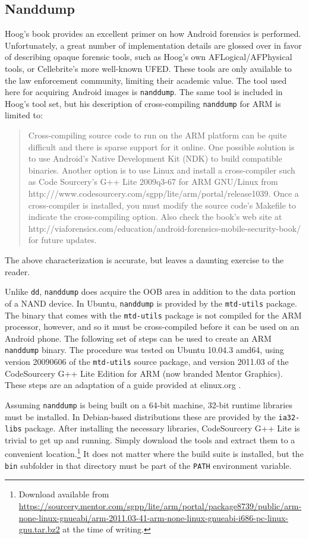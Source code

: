 \subsection{Nanddump}
Hoog's book \cite{hoog} provides an excellent primer on how Android forensics is performed.  Unfortunately, a great number of
implementation details are glossed over in favor of describing opaque forensic tools, such as Hoog's own AFLogical/AFPhysical tools,
or Cellebrite's more well-known UFED. These tools are only available to the law enforcement community, limiting their academic
value. The tool used here for acquiring Android images is \texttt{nanddump}. The same tool is included in Hoog's tool set, but his
description of cross-compiling \texttt{nanddump} for ARM is limited to: 
\begin{quote} Cross-compiling source code to run on the ARM platform can be quite difficult and there is sparse support for it
online.  One possible solution is to use Android's Native Development Kit (NDK) to build compatible binaries.  Another option is to
use Linux and install a cross-compiler such as Code Sourcery's G++ Lite 2009q3-67 for ARM GNU/Linux from
http:///www.codesourcery.com/sgpp/lite/arm/portal/release1039.  Once a cross-compiler is installed, you must modify the source
code's Makefile to indicate the cross-compiling option.  Also check the book's web site at
http://viaforensics.com/education/android-forensics-mobile-security-book/ for future updates.  \hspace{\fill}\cite{hoog} \end{quote}
The above characterization is accurate, but leaves a daunting exercise to the reader. 

Unlike \texttt{dd}, \texttt{nanddump} does acquire the OOB area in addition to the data portion of a NAND device.  In Ubuntu,
\texttt{nanddump} is provided by the \texttt{mtd-utils} package.  The binary that comes with the \texttt{mtd-utils} package is not
compiled for the ARM processor, however, and so it must be cross-compiled before it can be used on an Android phone.  The following
set of steps can be used to create an ARM \texttt{nanddump} binary.  The procedure was tested on Ubuntu 10.04.3 amd64, using version
20090606 of the \texttt{mtd-utils} source package, and version 2011.03 of the CodeSourcery G++ Lite Edition for ARM (now branded
Mentor Graphics).  These steps are an adaptation of a guide provided at elinux.org \cite{compilingmtd}.

Assuming \texttt{nanddump} is being built on a 64-bit machine, 32-bit runtime libraries must be installed.  In Debian-based
distributions these are provided by the \texttt{ia32-libs} package.  After installing the necessary libraries, CodeSourcery G++ Lite
is trivial to get up and running.  Simply download the tools and extract them to a convenient location.\footnote{Download available
from
\url{https://sourcery.mentor.com/sgpp/lite/arm/portal/package8739/public/arm-none-linux-gnueabi/arm-2011.03-41-arm-none-linux-gnueabi-i686-pc-linux-gnu.tar.bz2}
at the time of writing.} It does not matter where the build suite is installed, but the \texttt{bin} subfolder in that directory
must be part of the \texttt{PATH} environment variable.

